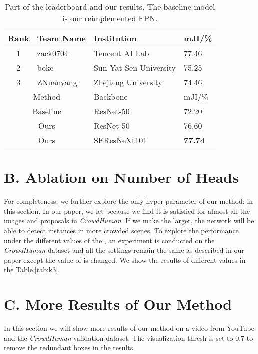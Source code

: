 \documentclass[10pt,twocolumn,letterpaper]{article}
\begin{document}
\begin{table}[htp]
   \begin{center}
   \begin{tabular}{c|l|l|p{8mm}<{\centering}}
   \hline\hline
   Rank &Team Name&Institution&mJI/\%\\
   \hline\hline
   1 & zack0704 & Tencent AI Lab & 77.46 \\
   2 & boke & Sun Yat-Sen University & 75.25 \\
   3 & ZNuanyang & Zhejiang University & 74.46 \\
   \hline\hline
   \multicolumn{2}{c|}{Method} & Backbone & mJI/\%\\
   \hline\hline
   \multicolumn{2}{c|}{Baseline} & ResNet-50 & 72.20 \\
   \hline
   \multicolumn{2}{c|}{Ours} & ResNet-50  & 76.60\\
   \multicolumn{2}{c|}{Ours} & SEResNeXt101 & {\bf 77.74}\\
   \hline
   \end{tabular}
   \end{center}
   \caption{Part of the leaderboard and our results. 
   The baseline model is our reimplemented FPN\cite{lin2017feature}.}
   \label{tab:ledaerboard}
\end{table}

\section*{B. Ablation on Number of Heads}
For completeness, we further explore the only hyper-parameter of our method: 
in this section.
In our paper, we let  because we find it is satisfied for almost all the images
and proposals in \emph{CrowdHuman}.
If we make the  larger, the network will be able to detect instances in more 
crowded scenes.
To explore the performance under the different values of the , an experiment is 
conducted on the \emph{CrowdHuman} dataset and all the settings remain the same as 
described in our paper except the value of  is changed.
We show the results of different  values in the Table.\ref{tab:k3}.

\section*{C. More Results of Our Method}
In this section we will show more results of our method on a video from YouTube and 
the \emph{CrowdHuman} validation dataset.
The visualization thresh is set to 0.7 to remove the redundant boxes in the results.
\end{document}
